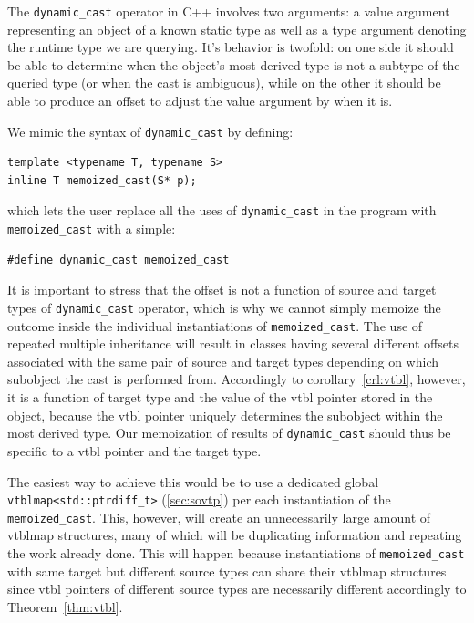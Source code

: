 \documentclass[preprint]{sigplanconf}
\makeatletter
\DeclareRobustCommand{\code}[1]{{\lstinline[breaklines=false,escapechar=@]{#1}}}
\makeatother
\begin{document}
The \code{dynamic_cast} operator in C++ involves two arguments: a value argument 
representing an object of a known static type as well as a type argument 
denoting the runtime type we are querying. It's behavior is twofold: on one side 
it should be able to determine when the object's most derived type is not a 
subtype of the queried type (or when the cast is ambiguous), while on the other 
it should be able to produce an offset to adjust the value argument by when it is.

We mimic the syntax of \code{dynamic_cast} by defining:

\begin{lstlisting}
template <typename T, typename S>
inline T memoized_cast(S* p);
\end{lstlisting}

\noindent
which lets the user replace all the uses of \code{dynamic_cast} in the program 
with \code{memoized_cast} with a simple:

\begin{lstlisting}
#define dynamic_cast memoized_cast
\end{lstlisting}

It is important to stress that the offset is not a function of source and target 
types of \code{dynamic_cast} operator, which is why we cannot simply memoize the 
outcome inside the individual instantiations of \code{memoized_cast}.
The use of repeated multiple inheritance will result in classes having several 
different offsets associated with the same pair of source and target types 
depending on which subobject the cast is performed from. Accordingly to 
corollary~\ref{crl:vtbl}, however, it is a function of target type and the value 
of the vtbl pointer stored in the object, because the vtbl pointer uniquely 
determines the subobject within the most derived type. Our memoization of 
results of \code{dynamic_cast} should thus be specific to a vtbl pointer and the 
target type. 

The easiest way to achieve this would be to use a dedicated global
\code{vtblmap<std::ptrdiff_t>} (\textsection\ref{sec:sovtp}) per each 
instantiation of the \code{memoized_cast}. This, however, will create an 
unnecessarily large amount of vtblmap structures, many of which will be  
duplicating information and repeating the work already done. This will happen 
because instantiations of \code{memoized_cast} with same target but different 
source types can share their vtblmap structures since vtbl pointers of different 
source types are necessarily different accordingly to Theorem~\ref{thm:vtbl}. 
\end{document}
